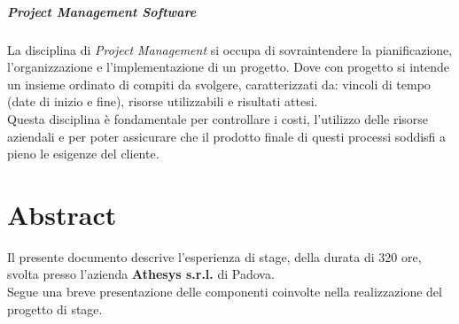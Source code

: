 \documentclass[12pt,a4paper,twoside,openright,english]{book}
\begin{document}
\paragraph*{Project Management Software}
La disciplina di \textit{Project Management} si occupa di sovraintendere la pianificazione, l'organizzazione e l'implementazione di un progetto. Dove con progetto si intende un insieme ordinato di compiti da svolgere, caratterizzati da: vincoli di tempo (date di inizio e fine), risorse utilizzabili e risultati attesi.\\
Questa disciplina è fondamentale per controllare i costi, l'utilizzo delle risorse aziendali e per poter assicurare che il prodotto finale di questi processi soddisfi a pieno le esigenze del cliente.\\

\chapter*{Abstract}\label{abstract}
	Il presente documento descrive l'esperienza di stage, della durata di 320 ore, svolta presso l'azienda \textbf{Athesys s.r.l.} di Padova.\\
	Segue una breve presentazione delle componenti coinvolte nella realizzazione del progetto di stage.
	
\end{document}
